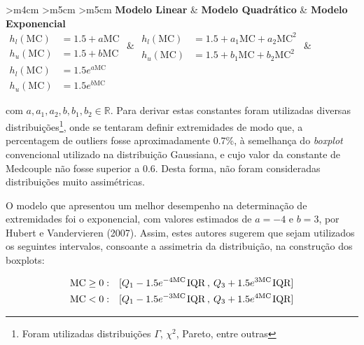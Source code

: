 \begin{center}
	\begin{tabular}{>{\centering\arraybackslash}m{4cm} >{\centering\arraybackslash}m{5cm} >{\centering\arraybackslash}m{5cm}}
		\textbf{Modelo Linear} & \textbf{Modelo Quadrático} & \textbf{Modelo Exponencial} \\
		\(\begin{aligned} 
			h_l(\text{MC}) &= 1.5 + a\text{MC} \\ 
			h_u(\text{MC}) &= 1.5 + b\text{MC} 
		\end{aligned}\) & 
		\(\begin{aligned} 
			h_l(\text{MC}) &= 1.5 + a_1\text{MC} + a_2\text{MC}^2\\ 
			h_u(\text{MC}) &= 1.5 + b_1\text{MC} + b_2\text{MC}^2
		\end{aligned}\) & 
		\(\begin{aligned} 
			h_l(\text{MC}) &= 1.5 e^{a\text{MC}} \\ 
			h_u(\text{MC}) &= 1.5 e^{b\text{MC}} 
		\end{aligned}\) \\
	\end{tabular}
\end{center}

com $a,a_1,a_2,b,b_1,b_2 \in \mathbb{R}$. Para derivar estas constantes foram utilizadas diversas distribuições\footnote{Foram utilizadas distribuições $\Gamma$, $\chi^2$, Pareto, entre outras}, onde se tentaram definir extremidades de modo que, a percentagem de outliers fosse aproximadamente 0.7\%, à semelhança do \textit{boxplot} convencional utilizado na distribuição Gaussiana, e cujo valor da constante de Medcouple não fosse superior a 0.6. Desta forma, não foram consideradas distribuições muito assimétricas.

O modelo que apresentou um melhor desempenho na determinação de extremidades foi o exponencial, com valores estimados de $a = -4$ e $b = 3$, por Hubert e Vandervieren (2007). Assim, estes autores sugerem que sejam utilizados os seguintes intervalos, consoante a assimetria da distribuição, na construção dos boxplots: 

\begin{align}
	\text{MC} \geq 0: & \quad [Q_1 -  1.5 e^{-4\text{MC}} \hspace{1px} \text{IQR} \hspace{2px} , \hspace{2px} Q_3 + 1.5 e^{3\text{MC}} \hspace{1px} \text{IQR}] 	\label{eq:medatual1} \\ \vspace{3px}
	\text{MC} < 0: & \quad [Q_1 -  1.5 e^{-3\text{MC}} \hspace{1px} \text{IQR} \hspace{2px} , \hspace{2px} Q_3 + 1.5 e^{4\text{MC}} \hspace{1px} \text{IQR}]
	\label{eq:medatual}
\end{align}

